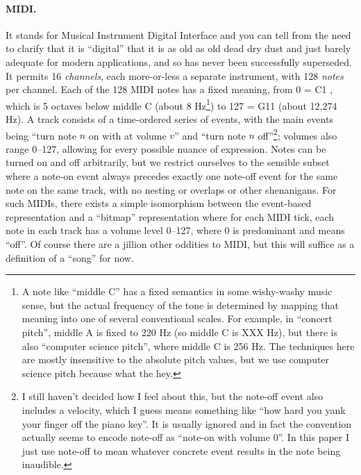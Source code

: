 \documentclass[twocolumn]{article}
\newcommand\comment[1]{}
\begin{document}
\paragraph{MIDI.} It stands for Musical Instrument Digital Interface
and you can tell from the need to clarify that it is ``digital'' that
it is as old as old dead dry dust and just barely adequate for modern
applications, and so has never been successfully superseded. It
permits 16 {\it channels}, each more-or-less a separate instrument,
with 128 {\it notes} per channel. Each of the 128 MIDI notes has a
fixed meaning, from 0 = C1 \comment{XXX?}, which is 5 octaves below
middle C (about 8 Hz\footnote{A note like ``middle C'' has a fixed
  semantics in some wishy-washy music sense, but the actual frequency
  of the tone is determined by mapping that meaning into one of
  several conventional scales. For example, in ``concert pitch'',
  middle A is fixed to 220 Hz (so middle C is XXX Hz), but there is
  also ``computer science pitch'', where middle C is 256 Hz. The
  techniques here are mostly insensitive to the absolute pitch values,
  but we use computer science pitch because what the hey. }) to 127 =
G11 (about 12,274 Hz). A track consists of a time-ordered series of
events, with the main events being ``turn note $n$ on with at volume
$v$'' and ``turn note $n$ off''\footnote{I still haven't decided how I
  feel about this, but the note-off event also includes a velocity,
  which I guess means something like ``how hard you yank your finger
  off the piano key''. It is usually ignored and in fact the
  convention actually seems to encode note-off as ``note-on with
  volume 0''. In this paper I just use note-off to mean whatever
  concrete event results in the note being inaudible.}; volumes also
range 0--127, allowing for every possible nuance of expression. Notes
can be turned on and off arbitrarily, but we restrict ourselves to the
sensible subset where a note-on event always precedes exactly one
note-off event for the same note on the same track, with no nesting or
overlaps or other shenanigans. For such MIDIs, there exists a simple
isomorphism between the event-based representation and a ``bitmap''
representation where for each MIDI tick, each note in each track has a
volume level 0--127, where 0 is predominant and means ``off''. Of course
there are a jillion other oddities to MIDI, but this will suffice as
a definition of a ``song'' for now.

\end{document}
